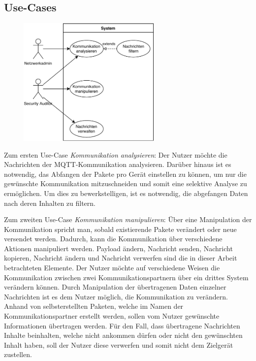     \subsection{Use-Cases}
    \begin{figure}[h]%
        \centering
        \includegraphics[width=7cm]{tex/bilder/3_anforderungen/Use-Case.pdf}
        \label{fig:use-case}
    \end{figure}
    
    Zum ersten Use-Case \emph{Kommunikation analysieren}:
    	Der Nutzer möchte die Nachrichten der \ac{MQTT}-Kommunikation analysieren.
    	Darüber hinaus ist es notwendig, das Abfangen der Pakete pro Gerät einstellen zu können, um nur die gewünschte Kommunikation mitzuschneiden und somit eine selektive Analyse zu ermöglichen.
    	Um dies zu bewerkstelligen, ist es notwendig, die abgefangen Daten nach deren Inhalten zu filtern.
    	
    Zum zweiten Use-Case \emph{Kommunikation manipulieren}:
        Über eine Manipulation der Kommunikation spricht man, sobald existierende Pakete verändert oder neue versendet werden. Dadurch, kann die Kommunikation über verschiedene Aktionen manipuliert werden. \glqq Payload ändern\grqq{}, \glqq Nachricht senden\grqq{}, \glqq Nachricht kopieren\grqq{}, \glqq Nachricht ändern\grqq{} und \glqq Nachricht verwerfen\grqq{} sind die in dieser Arbeit betrachteten Elemente.
    	Der Nutzer möchte auf verschiedene Weisen die Kommunikation zwischen zwei Kommunikationspartnern über ein drittes System verändern können.
    	Durch Manipulation der übertragenen Daten einzelner Nachrichten ist es dem Nutzer möglich, die Kommunikation zu verändern.
    	Anhand von selbsterstellten Paketen, welche im Namen der Kommunikationspartner erstellt werden, sollen vom Nutzer gewünschte Informationen übertragen werden.
    	Für den Fall, dass übertragene Nachrichten Inhalte beinhalten, welche nicht ankommen dürfen oder nicht den gewünschten Inhalt haben, soll der Nutzer diese verwerfen und somit nicht dem Zielgerät zustellen.
    	
